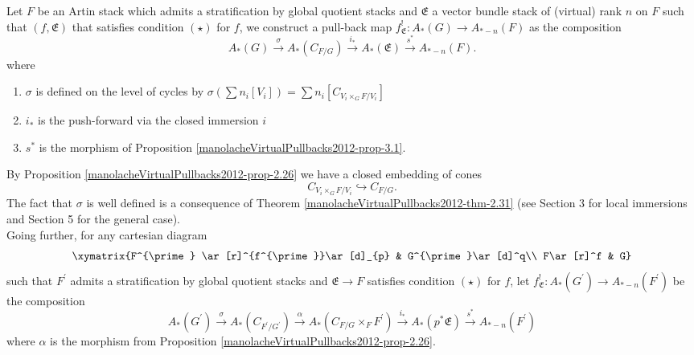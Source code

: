 \begin{construct}\label{manolacheVirtualPullbacks2012-constr-3.6}
Let $F$ be an Artin stack which admits a stratification by global quotient stacks and $\mathfrak{E}$ a vector bundle stack of (virtual) rank $n$ on $F$ such that $(f,\mathfrak{E})$ that satisfies condition $(\star)$ for $f$, we construct a pull-back map $f^{!}_\mathfrak{E}:A_*(G)\to A_{*-n}(F)$ as the composition
\begin{equation*}
 A_*(G)\stackrel{\sigma}\rightarrow A_*(C_{F/G})\stackrel{i_*}{\rightarrow}A_*(\mathfrak{E})\stackrel{s^*}{\rightarrow} A_{*-n}(F).
\end{equation*}
where
\begin{enumerate}
\item $\sigma$ is defined on the level of cycles by $\sigma(\sum n_i[V_i])=\sum n_i [C_{V_i\times_GF/V_i}]$
\item $i_*$ is the push-forward via the closed immersion $i$
\item $s^*$ is the morphism of Proposition \ref{manolacheVirtualPullbacks2012-prop-3.1}.
\end{enumerate}
By Proposition \ref{manolacheVirtualPullbacks2012-prop-2.26} we have a closed embedding of cones $$C_{V_i\times_GF/V_i}\hookrightarrow C_{F/G}.$$ The fact that $\sigma$ is well defined is a consequence of Theorem \ref{manolacheVirtualPullbacks2012-thm-2.31} (see \cite{K:03} Section 3 for local immersions and Section 5 for the general case).
 \\Going further, for any cartesian diagram
\begin{equation*}
 \xymatrix {F^{\prime} \ar[r]^{f^{\prime}}\ar[d]_{p} & G^{\prime}\ar[d]^q\\
             F\ar[r]^f & G}
\end{equation*}
such that $F^{\prime}$ admits a stratification by global quotient stacks and $\mathfrak{E}\to F$ satisfies condition $(\star)$ for $f$, let $f^{!}_{\mathfrak{E}}:A_*(G^{\prime})\to A_{*-n}(F^{\prime})$ be the composition
\begin{equation*}
 A_*(G^{\prime})\stackrel{\sigma}\rightarrow A_*(C_{F^{\prime}/G^{\prime}})\stackrel{\alpha}{\rightarrow} A_*(C_{F/G}\times_FF^{\prime})\stackrel{i_*}{\rightarrow}A_*(p^*\mathfrak{E})\stackrel{s^*}{\rightarrow}A_{*-n}(F^{\prime})
\end{equation*}
where $\alpha$ is the morphism from Proposition \ref{manolacheVirtualPullbacks2012-prop-2.26}.
\end{construct}

